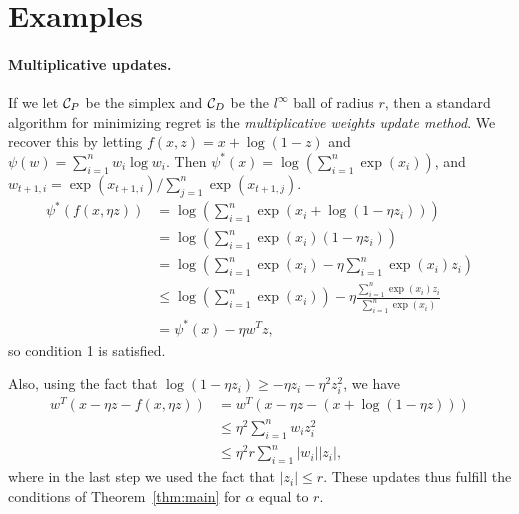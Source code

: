 \documentclass[11pt]{article}
\begin{document}
\section{Examples}
\paragraph{Multiplicative updates.} If we let $\mathcal{C}_P$ be the simplex and $\mathcal{C}_D$ be the 
$l^{\infty}$ ball of radius $r$, then a standard algorithm for minimizing regret is the 
\emph{multiplicative weights update method}. We recover this by letting $f(x,z) = x + \log(1-z)$ 
and $\psi(w) = \sum_{i=1}^n w_i\log w_i$. Then $\psi^*(x) = \log\left(\sum_{i=1}^n \exp(x_i)\right)$, 
and $w_{t+1,i} = \exp(x_{t+1,i})/\sum_{j=1}^n \exp(x_{t+1,j})$.
\begin{align*}
\psi^*(f(x,\eta z)) &= \log\left(\sum_{i=1}^n \exp(x_i + \log(1-\eta z_i))\right) \\
 &= \log\left(\sum_{i=1}^n \exp(x_i)(1-\eta z_i)\right) \\
 &= \log\left(\sum_{i=1}^n \exp(x_i) - \eta \sum_{i=1}^n \exp(x_i) z_i\right) \\
 &\leq \log\left(\sum_{i=1}^n \exp(x_i)\right) - \eta \frac{\sum_{i=1}^n \exp(x_i) z_i}{\sum_{i=1}^n \exp(x_i)} \\
 &= \psi^*(x) - \eta w^Tz,
\end{align*}
so condition 1 is satisfied.

Also, using the fact that $\log(1-\eta z_i) \geq -\eta z_i - \eta^2 z_i^2$, we have
\begin{align*}
w^T(x-\eta z - f(x, \eta z)) &= w^T(x-\eta z - (x + \log(1-\eta z))) \\
 &\leq \eta^2 \sum_{i=1}^n w_iz_i^2 \\
 &\leq \eta^2 r \sum_{i=1}^n |w_i||z_i|,
\end{align*}
where in the last step we used the fact that $|z_i| \leq r$. These updates 
thus fulfill the conditions of Theorem~\ref{thm:main} for $\alpha$ equal to 
$r$.
\end{document}
